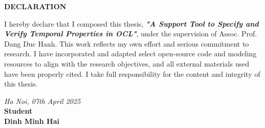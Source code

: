 \setlength{\parindent}{1cm}

\begin{center}
  \textbf{\large{DECLARATION}	}
\end{center}

I hereby declare that I composed this thesis, 
\textbf{\textit{"A Support Tool to Specify and Verify Temporal Properties in OCL"}},
under the supervision of Assoc. Prof. Dang Duc Hanh. 
This work reflects my own effort and serious commitment to research.
I have incorporated and adapted select open-source code and modeling resources to align with the research objectives, and all external materials used have been properly cited.
I take full responsibility for the content and integrity of this thesis.

\vspace{1cm}
\begin{flushright}
  \begin{minipage}{8cm}
    \centering
    \textit{Ha Noi, 07th April 2025}\\[0.2cm] %
    \textbf{Student}\\[2.5cm]

    \textbf{Dinh Minh Hai}
  \end{minipage}
\end{flushright}